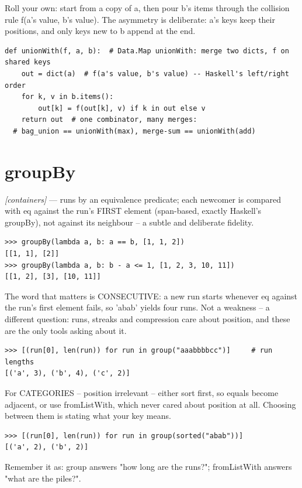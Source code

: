 \documentclass[11pt,letterpaper]{book}
\begin{document}
Roll your own: start from a copy of a, then pour b's items through the collision rule f(a's value, b's value). The asymmetry is deliberate: a's keys keep their positions, and only keys new to b append at the end.

\begin{lstlisting}[style=code]
def unionWith(f, a, b):  # Data.Map unionWith: merge two dicts, f on shared keys
    out = dict(a)  # f(a's value, b's value) -- Haskell's left/right order
    for k, v in b.items():
        out[k] = f(out[k], v) if k in out else v
    return out  # one combinator, many merges:
  # bag_union == unionWith(max), merge-sum == unionWith(add)
\end{lstlisting}

\section{groupBy}
\noindent\textit{[containers]} --- runs by an equivalence predicate; each newcomer is compared with eq against the run's FIRST element (span-based, exactly Haskell's groupBy), not against its neighbour -- a subtle and deliberate fidelity.
\begin{lstlisting}[style=spec]
>>> groupBy(lambda a, b: a == b, [1, 1, 2])
[[1, 1], [2]]
>>> groupBy(lambda a, b: b - a <= 1, [1, 2, 3, 10, 11])
[[1, 2], [3], [10, 11]]
\end{lstlisting}

The word that matters is CONSECUTIVE: a new run starts whenever eq against the run's first element fails, so 'abab' yields four runs. Not a weakness -- a different question: runs, streaks and compression care about position, and these are the only tools asking about it.

\begin{lstlisting}[style=spec]
>>> [(run[0], len(run)) for run in group("aaabbbbcc")]     # run lengths
[('a', 3), ('b', 4), ('c', 2)]
\end{lstlisting}

For CATEGORIES -- position irrelevant -- either sort first, so equals become adjacent, or use fromListWith, which never cared about position at all. Choosing between them is stating what your key means.

\begin{lstlisting}[style=spec]
>>> [(run[0], len(run)) for run in group(sorted("abab"))]
[('a', 2), ('b', 2)]
\end{lstlisting}

Remember it as: group answers "how long are the runs?"; fromListWith answers "what are the piles?".
\end{document}
